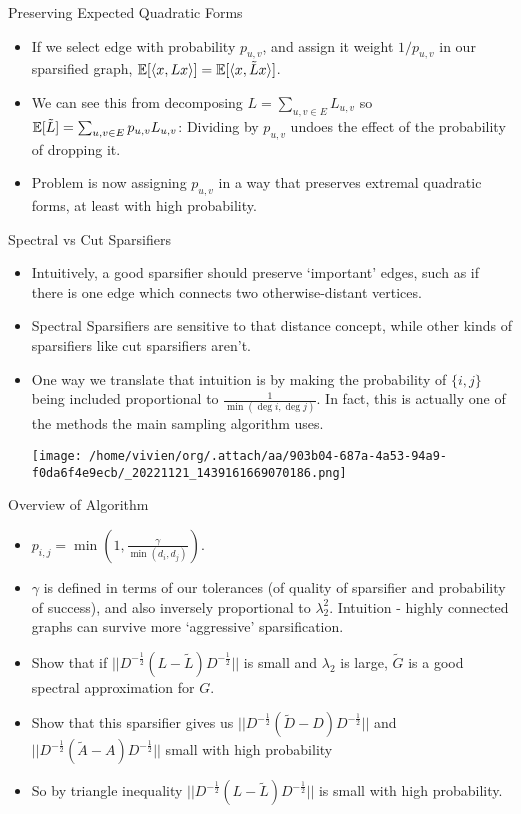 \documentclass[presentation]{beamer}
\begin{document}
\begin{frame}[label={sec:orgf7bc2a9}]{Preserving Expected Quadratic Forms}
\begin{itemize}
\item If we select edge with probability \(p_{u,v}\), and assign it weight \(1/p_{u,v}\) in our sparsified graph, \(\mathbb{E}[\langle x , Lx \rangle]=\mathbb{E}[\langle x , \tilde{L}x \rangle]\).
\item We can see this from decomposing \(L=\sum_{u,v \in E}L_{u,v}\) so \(\mathbb{E}[\tilde{L}]=\sum_{u,v \in E}p_{u,v}L_{u,v}\): Dividing by \(p_{u,v}\) undoes the effect of the probability of dropping it.
\item Problem is now assigning \(p_{u,v}\) in a way that preserves extremal quadratic forms, at least with high probability.
\end{itemize}
\end{frame}
\begin{frame}[label={sec:orge523b8a}]{Spectral vs Cut Sparsifiers}
\begin{itemize}
\item Intuitively, a good sparsifier should preserve `important' edges, such as if there is one edge which connects two otherwise-distant vertices.

\item Spectral Sparsifiers are sensitive to that distance concept, while other kinds of sparsifiers like cut sparsifiers aren't.

\item One way we translate that intuition is by making the probability of \(\{i,j\}\) being included proportional to  \(\frac{1}{\min(\deg i, \deg j)}\). In fact, this is actually one of the methods the main sampling algorithm uses.

\begin{center}
\texttt{[image: /home/vivien/org/.attach/aa/903b04-687a-4a53-94a9-f0da6f4e9ecb/\_20221121\_1439161669070186.png]}
\end{center}
\end{itemize}
\end{frame}
\begin{frame}[label={sec:org6662cdb}]{Overview of Algorithm}
\begin{itemize}
\item \(p_{i,j}=\min(1,\frac{\gamma}{\min(d_i,d_j)})\).
\item \(\gamma\) is defined in terms of our tolerances (of quality of sparsifier and probability of success), and also inversely proportional to \(\lambda_2^2\). Intuition - highly connected graphs can survive more `aggressive' sparsification.
\item Show that if \(||D^{-\frac12}(L-\tilde{L}) D^{-\frac12}||\) is small and \(\lambda_2\) is large, \(\tilde{G}\) is a good spectral approximation for \(G\).
\item Show that this sparsifier gives us \(||D^{-\frac12}(\tilde{D}-D)D^{-\frac12}||\) and \(||D^{-\frac12}(\tilde{A}-A)D^{-\frac12}||\) small with high probability
\item So by triangle inequality \(||D^{-\frac12}(L-\tilde{L}) D^{-\frac12}||\) is small with high probability.
\end{itemize}
\end{frame}
\end{document}
